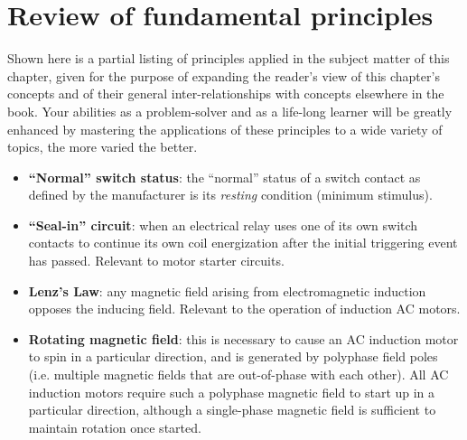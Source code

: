 















\filbreak
\section{Review of fundamental principles}

Shown here is a partial listing of principles applied in the subject matter of this chapter, given for the purpose of expanding the reader's view of this chapter's concepts and of their general inter-relationships with concepts elsewhere in the book.  Your abilities as a problem-solver and as a life-long learner will be greatly enhanced by mastering the applications of these principles to a wide variety of topics, the more varied the better.

\begin{itemize}
\item \textbf{``Normal'' switch status}: the ``normal'' status of a switch contact as defined by the manufacturer is its \textit{resting} condition (minimum stimulus).
\item \textbf{``Seal-in'' circuit}: when an electrical relay uses one of its own switch contacts to continue its own coil energization after the initial triggering event has passed.  Relevant to motor starter circuits.
\item \textbf{Lenz's Law}: any magnetic field arising from electromagnetic induction opposes the inducing field.  Relevant to the operation of induction AC motors.
\item \textbf{Rotating magnetic field}: this is necessary to cause an AC induction motor to spin in a particular direction, and is generated by polyphase field poles (i.e. multiple magnetic fields that are out-of-phase with each other).  All AC induction motors require such a polyphase magnetic field to start up in a particular direction, although a single-phase magnetic field is sufficient to maintain rotation once started.
\end{itemize}










